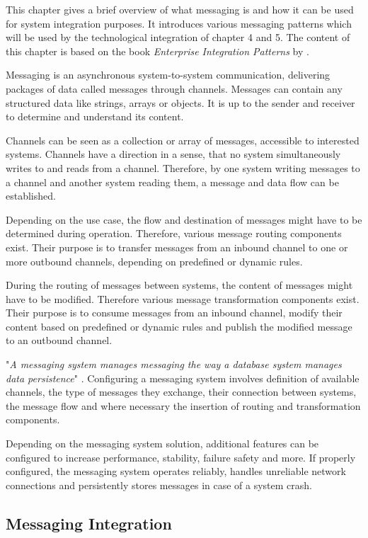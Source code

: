 This chapter gives a brief overview of what messaging is and how it can be used for system integration purposes. It introduces various messaging patterns which will be used by the technological integration of chapter 4 and 5.
The content of this chapter is based on the book \textit{Enterprise Integration Patterns} by \textcite{EIP}.

Messaging is an asynchronous system-to-system communication, delivering packages of data called messages through channels. Messages can contain any structured data like strings, arrays or objects. It is up to the sender and receiver to determine and understand its content.

Channels can be seen as a collection or array of messages, accessible to interested systems. Channels have a direction in a sense, that no system simultaneously writes to and reads from a channel. Therefore, by one system writing messages to a channel and another system reading them, a message and data flow can be established.

Depending on the use case, the flow and destination of messages might have to be determined during operation. Therefore, various message routing components exist. Their purpose is to transfer messages from an inbound channel to one or more outbound channels, depending on predefined or dynamic rules.

During the routing of messages between systems, the content of messages might have to be modified. Therefore various message transformation components exist. Their purpose is to consume messages from an inbound channel, modify their content based on predefined or dynamic rules and publish the modified message to an outbound channel.

"\textit{A messaging system manages messaging the way a database system manages data persistence}" \cite[p. 31]{EIP}. Configuring a messaging system involves definition of available channels, the type of messages they exchange, their connection between systems, the message flow and where necessary the insertion of routing and transformation components.

Depending on the messaging system solution, additional features can be configured to increase performance, stability, failure safety and more. If properly configured, the messaging system operates reliably, handles unreliable network connections and persistently stores messages in case of a system crash.

\subsection{Messaging Integration}

